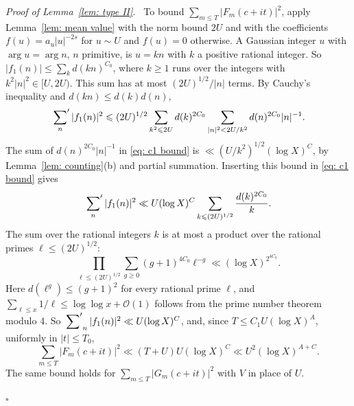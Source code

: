 \documentclass{article}
\numberwithin{equation}{section}
\newenvironment{proof}[1][Proof]{\par\medskip\noindent\textit{#1.}\ }{\hfill$\square$\par\medskip}
\newcommand{\Le}{\leqslant}
\newcommand{\Ge}{\geqslant}
\begin{document}
\begin{proof}[Proof of Lemma~\ref{lem: type II}]
To bound $\sum_{m \Le T} |F_m(c + it)|^2$, apply Lemma~\ref{lem: mean value} with the norm bound $2U$ and with the coefficients $f(u) = a_u |u|^{-2s}$ for $u \sim U$ and $f(u) = 0$ otherwise. A Gaussian integer $u$ with $\arg u = \arg n$, $n$ primitive, is $u = kn$ with $k$ a positive rational integer. So $|f_1(n)| \Le \sum_k d(kn)^{C_0}$, where $k \Ge 1$ runs over the integers with $k^2 |n|^2 \in [U, 2U)$. This sum has at most $(2U)^{1/2}/|n|$ terms. By Cauchy's inequality and $d(kn) \Le d(k) d(n)$,
\begin{equation}
\label{eq: c1 bound}
\sideset{}{'}\sum_{n} |f_1(n)|^2 \Le (2U)^{1/2} \sum_{k^2 \Le 2U} d(k)^{2C_0} \sum_{|n|^2 < 2U/k^2} d(n)^{2C_0} |n|^{-1}.
\end{equation}
The sum of $d(n)^{2C_0} |n|^{-1}$ in \eqref{eq: c1 bound} is $\ll (U/k^2)^{1/2} (\log X)^C$, by Lemma~\ref{lem: counting}(b) and partial summation. Inserting this bound in \eqref{eq: c1 bound} gives
\begin{equation*}
\sideset{}{'}\sum_{n} |f_1(n)|^2 \ll U (\log X)^C \sum_{k \Le (2U)^{1/2}} \frac{d(k)^{2C_0}}{k}.
\end{equation*}
The sum over the rational integers $k$ is at most a product over the rational primes $\ell \Le (2U)^{1/2}$:
\begin{equation*}
\prod_{\ell \Le (2U)^{1/2}} \sum_{g \Ge 0} (g + 1)^{4C_0} \ell^{-g} \ll (\log X)^{2^{4C_0}}.
\end{equation*}
Here $d(\ell^g) \Le (g + 1)^2$ for every rational prime $\ell$, and $\sum_{\ell \Le x} 1/\ell \Le \log\log x + \mathcal{O}(1)$ follows from the prime number theorem modulo $4$. So $\sideset{}{'}\sum_{n} |f_1(n)|^2 \ll U (\log X)^C$, and, since $T \Le C_1 U (\log X)^A$, uniformly in $|t| \Le T_0$,
\begin{equation*}
\sum_{m \Le T} |F_m(c + it)|^2 \ll (T + U) U (\log X)^C \ll U^2 (\log X)^{A + C}.
\end{equation*}
The same bound holds for $\sum_{m \Le T} |G_m(c + it)|^2$ with $V$ in place of $U$.


\end{proof}
\end{document}

